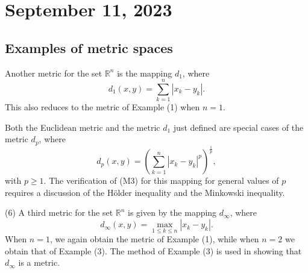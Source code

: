 \newpage
\section{September 11, 2023}
\subsection{Examples of metric spaces}

Another metric for the set $\mathbb{R}^n$ is the mapping $d_1$, where
\[
d_1(x, y) = \sum_{k=1}^{n} |x_k - y_k|.
\]
This also reduces to the metric of Example (1) when $n = 1$.

Both the Euclidean metric and the metric $d_1$ just defined are special cases of the metric $d_p$, where
\[
d_p(x, y) = \left( \sum_{k=1}^{n} |x_k - y_k|^p \right)^{\frac{1}{p}},
\]
with $p \geq 1$. The verification of (M3) for this mapping for general values of $p$ requires a discussion of the H\"{o}lder inequality and the Minkowski inequality.



(6) A third metric for the set $\mathbb{R}^n$ is given by the mapping $d_{\infty}$, where
\[
d_{\infty}(x, y) = \max_{1 \leq k \leq n} |x_k - y_k|.
\]
When $n = 1$, we again obtain the metric of Example (1), while when $n = 2$ we obtain that of Example (3). The method of Example (3) is used in showing that $d_{\infty}$ is a metric.

